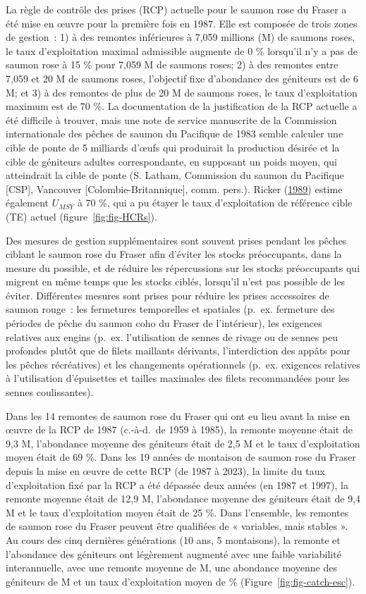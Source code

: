 \documentclass[french,11pt]{book}
\begin{document}
La règle de contrôle des prises (RCP) actuelle pour le saumon rose du Fraser a été mise en œuvre pour la première fois en 1987. Elle est composée de trois zones de gestion~: 1) à des remontes inférieures à 7,059 millions (M) de saumons roses, le taux d'exploitation maximal admissible augmente de 0 \% lorsqu'il n'y a pas de saumon rose à 15 \% pour 7,059 M de saumons roses; 2) à des remontes entre 7,059 et 20 M de saumons roses, l'objectif fixe d'abondance des géniteurs est de 6 M; et 3) à des remontes de plus de 20 M de saumons roses, le taux d'exploitation maximum est de 70 \%. La documentation de la justification de la RCP actuelle a été difficile à trouver, mais une note de service manuscrite de la Commission internationale des pêches de saumon du Pacifique de 1983 semble calculer une cible de ponte de 5 milliards d'œufs qui produirait la production désirée et la cible de géniteurs adultes correspondante, en supposant un poids moyen, qui atteindrait la cible de ponte (S. Latham, Commission du saumon du Pacifique {[}CSP{]}, Vancouver {[}Colombie-Britannique{]}, comm. pers.). Ricker (\protect\hyperlink{ref-rickerHistoryPresentState1989}{1989}) estime également \(U_{MSY}\) à 70 \%, qui a pu étayer le taux d'exploitation de référence cible (TE) actuel (figure~\ref{fig:fig-HCRs}).

Des mesures de gestion supplémentaires sont souvent prises pendant les pêches ciblant le saumon rose du Fraser afin d'éviter les stocks préoccupants, dans la mesure du possible, et de réduire les répercussions sur les stocks préoccupants qui migrent en même temps que les stocks ciblés, lorsqu'il n'est pas possible de les éviter. Différentes mesures sont prises pour réduire les prises accessoires de saumon rouge~: les fermetures temporelles et spatiales (p.~ex. fermeture des périodes de pêche du saumon coho du Fraser de l'intérieur), les exigences relatives aux engins (p.~ex. l'utilisation de sennes de rivage ou de sennes peu profondes plutôt que de filets maillants dérivants, l'interdiction des appâts pour les pêches récréatives) et les changements opérationnels (p.~ex. exigences relatives à l'utilisation d'épuisettes et tailles maximales des filets recommandées pour les sennes coulissantes).

Dans les 14 remontes de saumon rose du Fraser qui ont eu lieu avant la mise en œuvre de la RCP de 1987 (c.-à-d.~de 1959 à 1985), la remonte moyenne était de 9,3 M, l'abondance moyenne des géniteurs était de 2,5 M et le taux d'exploitation moyen était de 69 \%. Dans les 19 années de montaison de saumon rose du Fraser depuis la mise en œuvre de cette RCP (de 1987 à 2023), la limite du taux d'exploitation fixé par la RCP a été dépassée deux années (en 1987 et 1997), la remonte moyenne était de 12,9 M, l'abondance moyenne des géniteurs était de 9,4 M et le taux d'exploitation moyen était de 25 \%. Dans l'ensemble, les remontes de saumon rose du Fraser peuvent être qualifiées de « variables, mais stables ». Au cours des cinq dernières générations (10 ans, 5 montaisons), la remonte et l'abondance des géniteurs ont légèrement augmenté avec une faible variabilité interannuelle, avec une remonte moyenne de  M, une abondance moyenne des géniteurs de  M et un taux d'exploitation moyen de  \% (Figure~\ref{fig:fig-catch-esc}).
\end{document}
